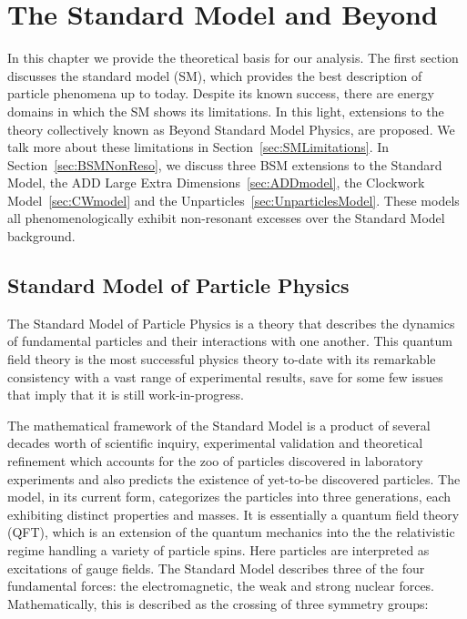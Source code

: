\chapter{The Standard Model and Beyond}\label{ch:theory}
In this chapter we provide the theoretical basis for our analysis. The first section discusses the standard model (SM), which provides the best description of particle phenomena up to today. Despite its known success, there are energy domains in which the SM shows its limitations. In this light, extensions to the theory collectively known as Beyond Standard Model Physics, are proposed. We talk more about these limitations in Section~\ref{sec:SMLimitations}. In Section~\ref{sec:BSMNonReso}, we discuss three BSM extensions to the Standard Model, the ADD Large Extra Dimensions~\ref{sec:ADDmodel}, the Clockwork Model~\ref{sec:CWmodel} and the Unparticles~\ref{sec:UnparticlesModel}. These models all phenomenologically exhibit non-resonant excesses over the Standard Model background. 

\section{Standard Model of Particle Physics}
The Standard Model of Particle Physics is a theory that describes the dynamics of fundamental particles and their interactions with one another. This quantum field theory is the most successful physics theory to-date with its remarkable consistency with a vast range of experimental results, save for some few issues that imply that it is still work-in-progress.

The mathematical framework of the Standard Model is a product of several decades worth of scientific inquiry, experimental validation and theoretical refinement which accounts for the zoo of particles discovered in laboratory experiments and also predicts the existence of yet-to-be discovered particles. The model, in its current form, categorizes the particles into three generations, each exhibiting distinct properties and masses. It is essentially a quantum field theory (QFT), which is an extension of the quantum mechanics into the the relativistic regime handling a variety of particle spins. Here particles are interpreted as excitations of gauge fields. The Standard Model describes three of the four fundamental forces: the electromagnetic, the weak and strong nuclear forces. Mathematically, this is described as the crossing of three symmetry groups:

